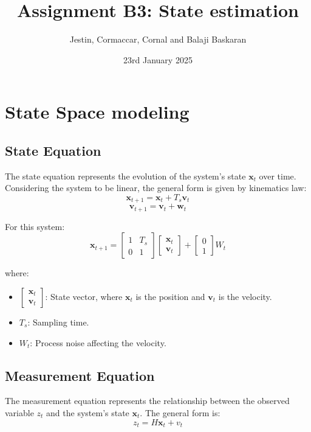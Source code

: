 \documentclass{article}
\title{Assignment B3: State estimation}
\author{Jestin, Cormaccar, Cornal and Balaji Baskaran}
\date{23rd January 2025}
\begin{document}
\maketitle

\section{State Space modeling}

\subsection*{State Equation}
The state equation represents the evolution of the system's state \( \mathbf{x}_t \) over time. Considering the system to be linear, the general form is given by kinematics law:
\[
\mathbf{x}_{t+1} = \mathbf{x}_t + T_s \mathbf{v}_{t}
\]
\[ \mathbf{v}_{t+1} = \mathbf{v}_{t} + \mathbf{w}_t\]

For this system:
\[
\mathbf{x}_{t+1} = 
\begin{bmatrix}
1 & T_s \\
0 & 1
\end{bmatrix} \begin{bmatrix}
   \mathbf{x}_t \\ \mathbf{v}_{t} 
\end{bmatrix}
 +
\begin{bmatrix}
0 \\
1
\end{bmatrix}
W_t
\]

where:
\begin{itemize}
    \item \( \begin{bmatrix} \mathbf{x}_t \\ \mathbf{v}_{t} \end{bmatrix} \): State vector, where \( \mathbf{x}_t \) is the position and \( \mathbf{v}_{t} \) is the velocity.
    \item \( T_s \): Sampling time.
    \item \( W_t \): Process noise affecting the velocity.
\end{itemize}

\subsection*{Measurement Equation}
The measurement equation represents the relationship between the observed variable \( z_t \) and the system's state \( \mathbf{x}_t \). The general form is:
\[
z_t = H \mathbf{x}_t + v_t
\]
\end{document}

